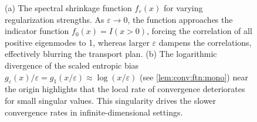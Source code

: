 \documentclass[noinfoline]{imsart}\setcounter{tocdepth}{2}
\theoremstyle{plain}
\begin{document}
\begin{figure}[h!]
\begin{tikzpicture}
    \end{tikzpicture}
    \caption{(a) The spectral shrinkage function $f_{\varepsilon}(x)$ for varying regularization strengths. As $\varepsilon \to 0$, the function approaches the indicator function $f_{0}(x) = I(x>0)$, forcing the correlation of all positive eigenmodes to 1, whereas larger $\varepsilon$ dampens the correlations, effectively blurring the transport plan. (b) The logarithmic divergence of the scaled entropic bias $g_{\varepsilon}(x)/\varepsilon = g_{1}(x/\varepsilon) \approx \log (x/\varepsilon)$ (see \cref{lem:conv:ftn:mono}) near the origin highlights that the local rate of convergence deteriorates for small singular values. This singularity drives the slower convergence rates in infinite-dimensional settings.}
    \label{fig:spectral_shrinkage}
\end{figure}
\end{document}
